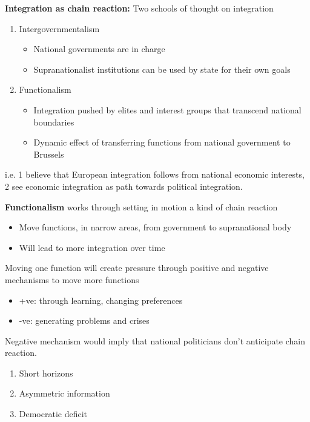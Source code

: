 \documentclass{beamer}
\begin{document}
\begin{frame}
  \textbf{Integration as chain reaction:} Two schools of thought on integration
  \begin{enumerate}
    \item Intergovernmentalism
    \begin{itemize}
      \item National governments are in charge
      \item Supranationalist institutions can be used by state for their own goals
    \end{itemize}
    \item Functionalism
    \begin{itemize}
      \item Integration pushed by elites and interest groups that transcend national boundaries
      \item Dynamic effect of transferring functions from national government to Brussels
    \end{itemize}
  \end{enumerate}
  i.e. 1 believe that European integration follows from national economic interests, 2 see economic integration as path towards political integration.
\end{frame}

\begin{frame}
  \textbf{Functionalism} works through setting in motion a kind of chain reaction
  \begin{itemize}
    \item Move functions, in narrow areas, from government to supranational body
    \item Will lead to more integration over time
  \end{itemize}
  Moving one function will create pressure through positive and negative mechanisms to move more functions
  \begin{itemize}
    \item +ve: through learning, changing preferences
    \item -ve: generating problems and crises
  \end{itemize}
  Negative mechanism would imply that national politicians don't anticipate chain reaction.
  \begin{enumerate}
    \item Short horizons
    \item Asymmetric information
    \item Democratic deficit
  \end{enumerate}
\end{frame}
\end{document}

